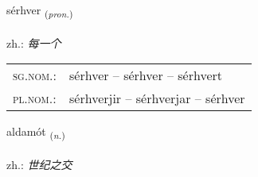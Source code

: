 \documentclass[frontgrid, backgrid]{flacards}\usepackage[]{graphicx}\usepackage[]{xcolor}
\begin{document}
\renewcommand{\flhead}{\vskip5pt \fboxsep=0pt {\small\bfseries\footnotesize Fornafn | 代词}}
\renewcommand{\fcfoot}{\vskip5pt \fboxsep=0pt \hspace{2pt}{\small\bfseries\footnotesize 3K}}

\renewcommand{\blhead}{\vskip5pt {\small\bfseries\footnotesize Fornafn | 代词 }}
\renewcommand{\bcfoot}{\vskip5pt \hspace{2pt}{\small\bfseries\footnotesize 3K}}


{sérhver \small{\textsubscript{(\textit{pron.})}} \\[1ex] %
 \\
zh.: \emph{每一个} \\  [2ex]
\renewcommand*{\arraystretch}{0.8}
\begin{tabular}{ll}
\textsc{sg.nom.}: & sérhver  --  sérhver -- sérhvert \\ 
\textsc{pl.nom.}: & sérhverjir -- sérhverjar -- sérhver
\end{tabular}
}

\renewcommand{\flhead}{\vskip5pt \fboxsep=0pt {\small\bfseries\footnotesize Nafnorð | 名词}}
\renewcommand{\fcfoot}{\vskip5pt \fboxsep=0pt \hspace{2pt}{\small\bfseries\footnotesize 3K}}

\renewcommand{\blhead}{\vskip5pt {\small\bfseries\footnotesize Nafnorð | 名词 }}
\renewcommand{\bcfoot}{\vskip5pt \hspace{2pt}{\small\bfseries\footnotesize 3K}}


{aldamót \small{\textsubscript{(\textit{n.})}} \\[1ex] %
\textphonetic{[altamout]} \\
zh.: \emph{世纪之交} \\  [2ex]
\renewcommand*{\arraystretch}{0.8}
}
\end{document}
